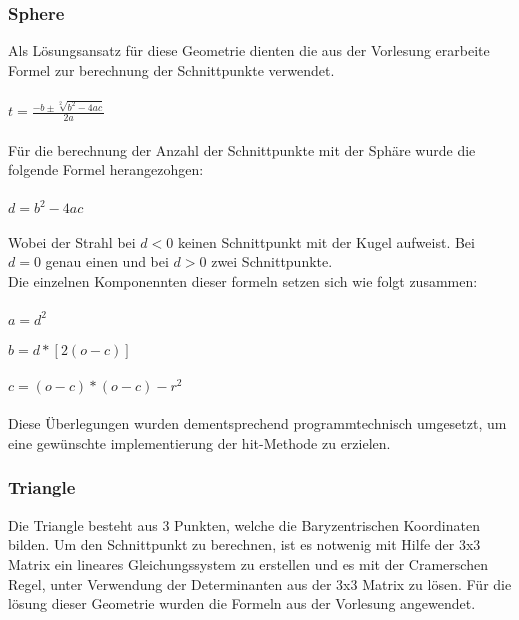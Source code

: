 \documentclass[14pt]{extarticle}
\begin{document}
\subsubsection{Sphere}
Als Lösungsansatz für diese Geometrie dienten die aus der Vorlesung erarbeite Formel zur berechnung der Schnittpunkte verwendet.
\\\\\begin{math} t=\frac{-b\pm \sqrt[2]{b^2-4ac}}{2a}\end{math}\\\\
Für die berechnung der Anzahl der Schnittpunkte mit der Sphäre wurde die folgende Formel herangezohgen:
\\\\\begin{math} d=b^2-4ac\end{math}\\\\
Wobei der Strahl bei \begin{math}d < 0\end{math} keinen Schnittpunkt mit der Kugel aufweist. Bei \begin{math}d = 0\end{math} genau einen und bei \begin{math}d > 0\end{math} zwei Schnittpunkte.\\
Die einzelnen Komponennten dieser formeln setzen sich wie folgt zusammen:\\\\
\begin{math}a=d^2\end{math}\\\\
\begin{math}b=d*[2(o-c)]\end{math}\\\\
\begin{math}c=(o-c)*(o-c)-r^2\end{math}\\\\

Diese Überlegungen wurden dementsprechend programmtechnisch umgesetzt, um eine gewünschte implementierung der hit-Methode zu erzielen.
 

\subsubsection{Triangle}
Die Triangle besteht aus 3 Punkten, welche die Baryzentrischen Koordinaten bilden. Um den Schnittpunkt zu berechnen, ist es notwenig mit Hilfe der 3x3 Matrix ein lineares Gleichungssystem zu erstellen und es mit der Cramerschen Regel, unter Verwendung der Determinanten aus der 3x3 Matrix zu lösen.
Für die lösung dieser Geometrie wurden die Formeln aus der Vorlesung angewendet.
\end{document}

